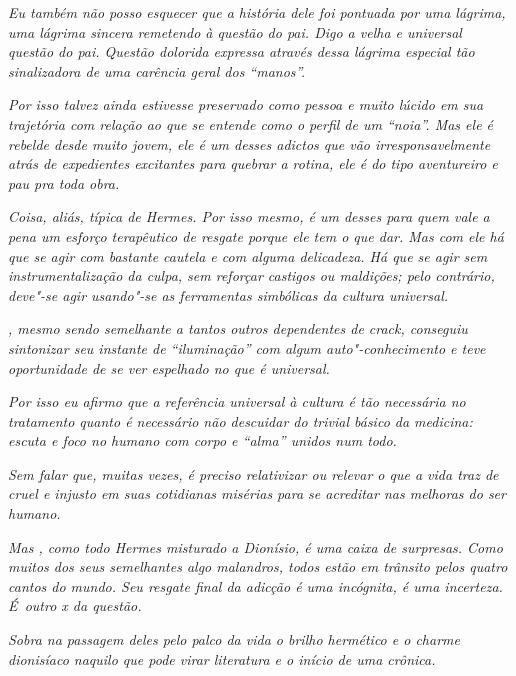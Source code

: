 \emph{Eu também não posso esquecer que a história dele foi pontuada por
uma lágrima, uma lágrima sincera remetendo à questão do pai. Digo a velha
e universal questão do pai. Questão dolorida expressa através dessa
lágrima especial tão sinalizadora de uma carência geral dos ``manos''.}~

\emph{Por isso  talvez ainda estivesse preservado como pessoa e muito
lúcido em sua trajetória com relação ao que se entende como o perfil de
um ``noia''. Mas ele é rebelde desde muito jovem, ele é um desses
adictos que vão irresponsavelmente atrás de expedientes excitantes para
quebrar a rotina, ele é do tipo aventureiro e pau pra toda obra.}~

\emph{Coisa, aliás, típica de Hermes. Por isso mesmo,  é um desses
para quem vale a pena um esforço terapêutico de resgate porque ele tem o
que dar. Mas com ele há que se agir com bastante cautela e com alguma
delicadeza. Há que se agir sem instrumentalização da culpa, sem reforçar
castigos ou maldições; pelo contrário, deve"-se agir usando"-se as
ferramentas simbólicas da cultura universal.}~

\emph{, mesmo sendo semelhante a tantos outros dependentes de crack,
conseguiu sintonizar seu instante de ``iluminação'' com algum
auto"-conhecimento e teve oportunidade de se ver espelhado no que é
universal.}~

\emph{Por isso eu afirmo que a referência universal à cultura é tão
necessária no tratamento quanto é necessário não descuidar do trivial
básico da medicina: escuta e foco no humano com corpo e ``alma'' unidos
num todo.}~

\emph{Sem falar que, muitas vezes, é preciso relativizar ou relevar o
que a vida traz de cruel e injusto em suas cotidianas misérias para se
acreditar nas melhoras do ser humano.}~

\emph{Mas , como todo Hermes misturado a Dionísio, é uma caixa de
surpresas. Como muitos dos seus semelhantes algo malandros, todos estão
em trânsito pelos quatro cantos do mundo. Seu resgate final da adicção é
uma incógnita, é uma incerteza. É~outro x da questão.}~

\emph{Sobra na passagem deles pelo palco da vida o brilho hermético e o
charme dionisíaco naquilo que pode virar literatura e o início de uma
crônica.~}
